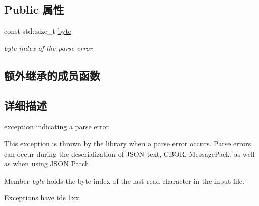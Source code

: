 \subsection*{Public 属性}
\begin{DoxyCompactItemize}
\item 
const std\+::size\+\_\+t \mbox{\hyperlink{classnlohmann_1_1detail_1_1parse__error_a9505aaa1ca943be927eec7cc579592ff}{byte}}
\begin{DoxyCompactList}\small\item\em byte index of the parse error \end{DoxyCompactList}\end{DoxyCompactItemize}
\subsection*{额外继承的成员函数}


\subsection{详细描述}
exception indicating a parse error 

This exception is thrown by the library when a parse error occurs. Parse errors can occur during the deserialization of J\+S\+ON text, C\+B\+OR, Message\+Pack, as well as when using J\+S\+ON Patch.

Member {\itshape byte} holds the byte index of the last read character in the input file.

Exceptions have ids 1xx.

